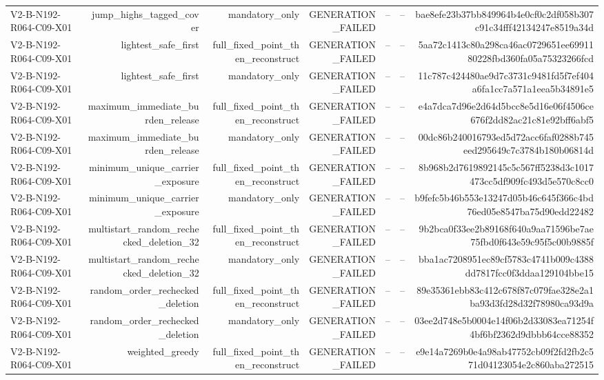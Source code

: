 {\begin{longtable}{lrrrrrr}
V2-B-N192-R064-C09-X01 & jump\_highs\_tagged\_cover & mandatory\_only & GENERATION\_FAILED & -- & -- & bae8efe23b37bb849964b4e0cf0c2df058b307c91c34fff42134247e8519a34d \\
V2-B-N192-R064-C09-X01 & lightest\_safe\_first & full\_fixed\_point\_then\_reconstruct & GENERATION\_FAILED & -- & -- & 5aa72c1413c80a298ca46ac0729651ee6991180228fbd360fa05a75323266fcd \\
V2-B-N192-R064-C09-X01 & lightest\_safe\_first & mandatory\_only & GENERATION\_FAILED & -- & -- & 11c787c424480ae9d7c3731c9481fd5f7ef404a6fa1cc7a571a1eea5b34891e5 \\
V2-B-N192-R064-C09-X01 & maximum\_immediate\_burden\_release & full\_fixed\_point\_then\_reconstruct & GENERATION\_FAILED & -- & -- & e4a7dca7d96e2d64d5bcc8e5d16e06f4506ce676f2dd82ac21c81e92bff6abf5 \\
V2-B-N192-R064-C09-X01 & maximum\_immediate\_burden\_release & mandatory\_only & GENERATION\_FAILED & -- & -- & 00dc86b240016793ed5d72acc6faf0288b745eed295649c7c3784b180b06814d \\
V2-B-N192-R064-C09-X01 & minimum\_unique\_carrier\_exposure & full\_fixed\_point\_then\_reconstruct & GENERATION\_FAILED & -- & -- & 8b968b2d7619892145c5c567ff5238d3c1017473cc5df909fc493d5e570c8cc0 \\
V2-B-N192-R064-C09-X01 & minimum\_unique\_carrier\_exposure & mandatory\_only & GENERATION\_FAILED & -- & -- & b9fefc5b46b553e13247d05b46c645f366c4bd76ed05e8547ba75d90edd22482 \\
V2-B-N192-R064-C09-X01 & multistart\_random\_rechecked\_deletion\_32 & full\_fixed\_point\_then\_reconstruct & GENERATION\_FAILED & -- & -- & 9b2bca0f33ee2b89168f640a9aa71596be7ae75fbd0f643e59c95f5c00b9885f \\
V2-B-N192-R064-C09-X01 & multistart\_random\_rechecked\_deletion\_32 & mandatory\_only & GENERATION\_FAILED & -- & -- & bba1ac7208951ec89cf5783c4741b009c4388dd7817fcc0f3ddaa129104bbe15 \\
V2-B-N192-R064-C09-X01 & random\_order\_rechecked\_deletion & full\_fixed\_point\_then\_reconstruct & GENERATION\_FAILED & -- & -- & 89e35361ebb83c412c678f87c079fae328e2a1ba93d3fd28d32f78980ca93d9a \\
V2-B-N192-R064-C09-X01 & random\_order\_rechecked\_deletion & mandatory\_only & GENERATION\_FAILED & -- & -- & 03ee2d748e5b0004e14f06b2d33083ea71254f4bf6bf2362d9dbbb64cce88352 \\
V2-B-N192-R064-C09-X01 & weighted\_greedy & full\_fixed\_point\_then\_reconstruct & GENERATION\_FAILED & -- & -- & e9e14a7269b0e4a98ab47752cb09f2fd2fb2c571d04123054e2c860aba272515 \\

\end{longtable}}

